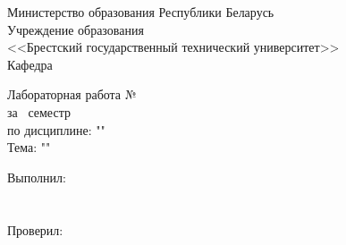 \begin{center}
    Министерство образования Республики Беларусь\\
    Учреждение образования\\
    <<Брестский государственный технический университет>>\\
    Кафедра \titlePageKafedra\\
\end{center}

\vfill

\begin{center}
    Лабораторная работа №\titlePageLabNumber\\
    за \titlePageSemestr~семестр\\
    по дисциплине: "\titlePageLesson"\\
    Тема: "\titlePageTopic"\\
\end{center}

\vfill

\begin{flushright}
    \begin{minipage}[t]{7cm}
        Выполнил:\\
        \titlePageStudentType\\
        \titlePageStudentSurname~\titlePageStudentName\\

        Проверил:\\
        \titlePageTeacherType\\
        \titlePageTeacherSurname~\titlePageTeacherName\\
    \end{minipage}
\end{flushright}

\vfill

\begin{center}
    \titlePageCity~\ESKDtheYear\\
\end{center}